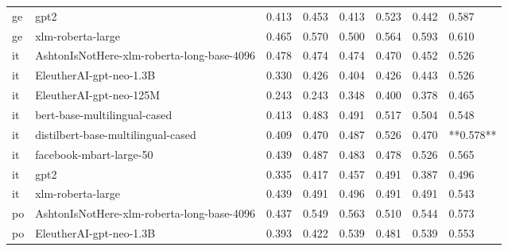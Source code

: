 \begin{tabular}{llllllll}
      ge &                                       gpt2 & 0.413 &                     0.453 &                 0.413 &                  0.523 &                                   0.442 &     0.587 \\
      ge &                          xlm-roberta-large & 0.465 &                     0.570 &                 0.500 &                  0.564 &                                   0.593 &     0.610 \\
      it & AshtonIsNotHere-xlm-roberta-long-base-4096 & 0.478 &                     0.474 &                 0.474 &                  0.470 &                                   0.452 &     0.526 \\
      it &                    EleutherAI-gpt-neo-1.3B & 0.330 &                     0.426 &                 0.404 &                  0.426 &                                   0.443 &     0.526 \\
      it &                    EleutherAI-gpt-neo-125M & 0.243 &                     0.243 &                 0.348 &                  0.400 &                                   0.378 &     0.465 \\
      it &               bert-base-multilingual-cased & 0.413 &                     0.483 &                 0.491 &                  0.517 &                                   0.504 &     0.548 \\
      it &         distilbert-base-multilingual-cased & 0.409 &                     0.470 &                 0.487 &                  0.526 &                                   0.470 & **0.578** \\
      it &                    facebook-mbart-large-50 & 0.439 &                     0.487 &                 0.483 &                  0.478 &                                   0.526 &     0.565 \\
      it &                                       gpt2 & 0.335 &                     0.417 &                 0.457 &                  0.491 &                                   0.387 &     0.496 \\
      it &                          xlm-roberta-large & 0.439 &                     0.491 &                 0.496 &                  0.491 &                                   0.491 &     0.543 \\
      po & AshtonIsNotHere-xlm-roberta-long-base-4096 & 0.437 &                     0.549 &                 0.563 &                  0.510 &                                   0.544 &     0.573 \\
      po &                    EleutherAI-gpt-neo-1.3B & 0.393 &                     0.422 &                 0.539 &                  0.481 &                                   0.539 &     0.553 \\

\end{tabular}
